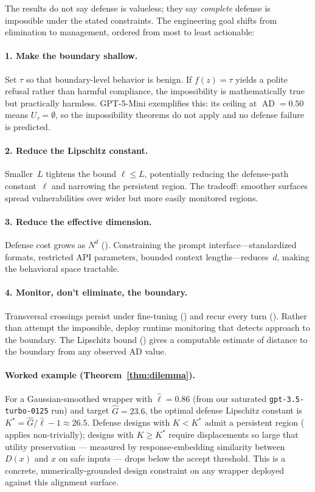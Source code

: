 \documentclass[11pt]{article}
\newcommand{\AD}{\operatorname{AD}}
\begin{document}
The results do not say defense is valueless; they say \emph{complete}
defense is impossible under the stated constraints. The engineering
goal shifts from elimination to management, ordered from most to least
actionable:

\paragraph{1. Make the boundary shallow.}
Set $\tau$ so that boundary-level behavior is benign. If $f(z) = \tau$
yields a polite refusal rather than harmful compliance, the
impossibility is mathematically true but practically harmless.
GPT-5-Mini exemplifies this: its ceiling at $\AD = 0.50$ means
$U_\tau = \emptyset$, so the impossibility theorems do not apply and
no defense failure is predicted.

\paragraph{2. Reduce the Lipschitz constant.}
Smaller~$L$ tightens the bound $\ell \leq L$, potentially reducing
the defense-path constant~$\ell$ and narrowing the persistent region.
The tradeoff: smoother surfaces spread vulnerabilities over wider but
more easily monitored regions.

\paragraph{3. Reduce the effective dimension.}
Defense cost grows as $N^d$ (). Constraining the prompt
interface---standardized formats, restricted API parameters, bounded
context lengths---reduces~$d$, making the behavioral space tractable.

\paragraph{4. Monitor, don't eliminate, the boundary.}
Transversal crossings persist under fine-tuning ()
and recur every turn (). Rather than attempt the
impossible, deploy runtime monitoring that detects approach to the
boundary. The Lipschitz bound () gives a
computable estimate of distance to the boundary from any observed AD
value.

\paragraph{Worked example (Theorem~\ref{thm:dilemma}).}
For a Gaussian-smoothed wrapper with $\hat\ell = 0.86$ (from our
saturated \texttt{gpt-3.5-turbo-0125} run) and target
$\hat G = 23.6$, the optimal defense Lipschitz constant is
$K^* = \hat G / \hat\ell - 1 \approx 26.5$. Defense designs with
$K < K^*$ admit a persistent region ( applies
non-trivially); designs with $K \geq K^*$ require displacements so
large that utility preservation --- measured by response-embedding
similarity between $D(x)$ and $x$ on safe inputs --- drops below the
accept threshold. This is a concrete, numerically-grounded design
constraint on any wrapper deployed against this alignment surface.
\end{document}
